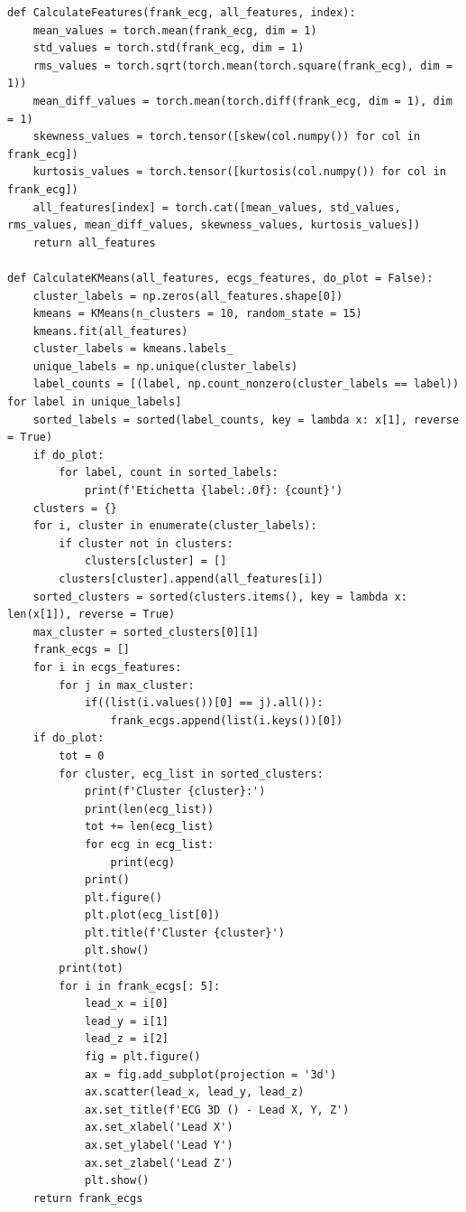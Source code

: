 \documentclass[12pt,english]{report}
\begin{document}
\lstset{language=Python}
\begin{lstlisting}[aboveskip=15pt, belowskip=15pt, basicstyle=\fontsize{8}{10}\selectfont, keywordstyle=\color{blue}, breaklines=true, label=snippet:clustering]
def CalculateFeatures(frank_ecg, all_features, index):
    mean_values = torch.mean(frank_ecg, dim = 1)
    std_values = torch.std(frank_ecg, dim = 1)
    rms_values = torch.sqrt(torch.mean(torch.square(frank_ecg), dim = 1))
    mean_diff_values = torch.mean(torch.diff(frank_ecg, dim = 1), dim = 1)
    skewness_values = torch.tensor([skew(col.numpy()) for col in frank_ecg])
    kurtosis_values = torch.tensor([kurtosis(col.numpy()) for col in frank_ecg])
    all_features[index] = torch.cat([mean_values, std_values, rms_values, mean_diff_values, skewness_values, kurtosis_values])
    return all_features

def CalculateKMeans(all_features, ecgs_features, do_plot = False):
    cluster_labels = np.zeros(all_features.shape[0])
    kmeans = KMeans(n_clusters = 10, random_state = 15)
    kmeans.fit(all_features)
    cluster_labels = kmeans.labels_
    unique_labels = np.unique(cluster_labels)
    label_counts = [(label, np.count_nonzero(cluster_labels == label)) for label in unique_labels]
    sorted_labels = sorted(label_counts, key = lambda x: x[1], reverse = True)
    if do_plot:
        for label, count in sorted_labels:
            print(f'Etichetta {label:.0f}: {count}')
    clusters = {}
    for i, cluster in enumerate(cluster_labels):
        if cluster not in clusters:
            clusters[cluster] = []
        clusters[cluster].append(all_features[i])
    sorted_clusters = sorted(clusters.items(), key = lambda x: len(x[1]), reverse = True)
    max_cluster = sorted_clusters[0][1]
    frank_ecgs = []
    for i in ecgs_features:
        for j in max_cluster:
            if((list(i.values())[0] == j).all()):
                frank_ecgs.append(list(i.keys())[0])
    if do_plot:
        tot = 0
        for cluster, ecg_list in sorted_clusters:
            print(f'Cluster {cluster}:')
            print(len(ecg_list))
            tot += len(ecg_list)
            for ecg in ecg_list:
                print(ecg)
            print()
            plt.figure()
            plt.plot(ecg_list[0])
            plt.title(f'Cluster {cluster}')
            plt.show()
        print(tot)
        for i in frank_ecgs[: 5]:
            lead_x = i[0]
            lead_y = i[1]
            lead_z = i[2]
            fig = plt.figure()
            ax = fig.add_subplot(projection = '3d')
            ax.scatter(lead_x, lead_y, lead_z)
            ax.set_title(f'ECG 3D () - Lead X, Y, Z')
            ax.set_xlabel('Lead X')
            ax.set_ylabel('Lead Y')
            ax.set_zlabel('Lead Z')
            plt.show()
    return frank_ecgs
\end{lstlisting}
\end{document}
